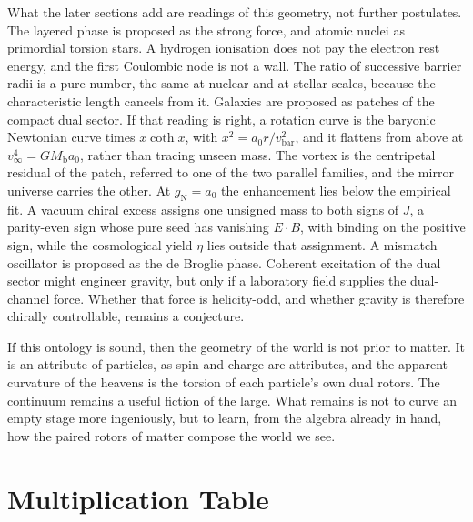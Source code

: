 \documentclass[a4paper]{article}
\begin{document}
What the later sections add are readings of this geometry, not further postulates. The layered phase is proposed as the strong force, and atomic nuclei as primordial torsion stars. A hydrogen ionisation does not pay the electron rest energy, and the first Coulombic node is not a wall. The ratio of successive barrier radii is a pure number, the same at nuclear and at stellar scales, because the characteristic length cancels from it. Galaxies are proposed as patches of the compact dual sector. If that reading is right, a rotation curve is the baryonic Newtonian curve times $x\coth x$, with $x^2=a_0r/v_{\text{bar}}^2$, and it flattens from above at $v_\infty^4=GM_{\text{b}}a_0$, rather than tracing unseen mass. The vortex is the centripetal residual of the patch, referred to one of the two parallel families, and the mirror universe carries the other. At $g_{\text{N}}=a_0$ the enhancement lies below the empirical fit. A vacuum chiral excess assigns one unsigned mass to both signs of $J$, a parity-even sign whose pure seed has vanishing $E\cdot B$, with binding on the positive sign, while the cosmological yield $\eta$ lies outside that assignment. A mismatch oscillator is proposed as the de Broglie phase. Coherent excitation of the dual sector might engineer gravity, but only if a laboratory field supplies the dual-channel force. Whether that force is helicity-odd, and whether gravity is therefore chirally controllable, remains a conjecture.

If this ontology is sound, then the geometry of the world is not prior to matter. It is an attribute of particles, as spin and charge are attributes, and the apparent curvature of the heavens is the torsion of each particle's own dual rotors. The continuum remains a useful fiction of the large. What remains is not to curve an empty stage more ingeniously, but to learn, from the algebra already in hand, how the paired rotors of matter compose the world we see.

\clearpage
\appendix

\section{Multiplication Table}
\label{app:mult-table}
\end{document}
